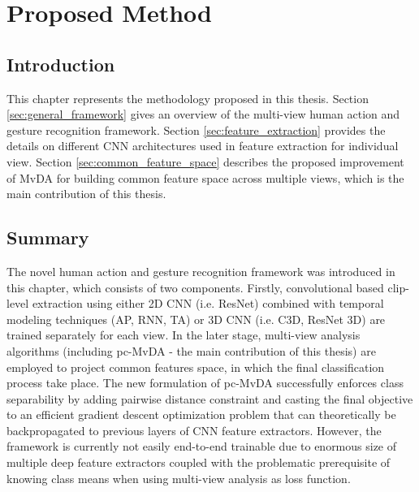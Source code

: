 
\chapter{Proposed Method} \label{chap:method}
    \section{Introduction}
        This chapter represents the methodology proposed in this thesis.
        Section \ref{sec:general_framework} gives an overview of the multi-view human action and gesture recognition framework.
        Section \ref{sec:feature_extraction} provides the details on different CNN architectures used in feature extraction for individual view.
        Section \ref{sec:common_feature_space} describes the proposed improvement of MvDA for building common feature space across multiple views, which is the main contribution of this thesis.

    
    
    

    \section{Summary}
        The novel human action and gesture recognition framework was introduced in this chapter, which consists of two components.
        Firstly, convolutional based clip-level extraction using either 2D CNN (i.e. ResNet) combined with temporal modeling techniques (AP, RNN, TA) or 3D CNN (i.e. C3D, ResNet 3D) are trained separately for each view.
        In the later stage, multi-view analysis algorithms (including pc-MvDA - the main contribution of this thesis) are employed to project common features space, in which the final classification process take place.
        The new formulation of pc-MvDA successfully enforces class separability by adding pairwise distance constraint and casting the final objective to an efficient gradient descent optimization problem that can theoretically be backpropagated to previous layers of CNN feature extractors.
        However, the framework is currently not easily end-to-end trainable due to enormous size of multiple deep feature extractors coupled with the problematic prerequisite of knowing class means when using multi-view analysis as loss function.
